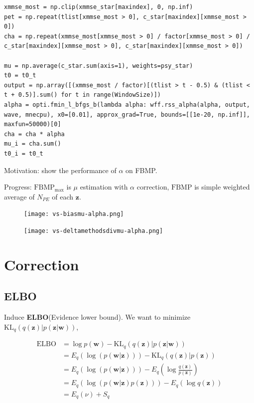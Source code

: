 \documentclass[notitlepage]{article}
\begin{document}
\begin{lstlisting}
xmmse_most = np.clip(xmmse_star[maxindex], 0, np.inf)
pet = np.repeat(tlist[xmmse_most > 0], c_star[maxindex][xmmse_most > 0])
cha = np.repeat(xmmse_most[xmmse_most > 0] / factor[xmmse_most > 0] / c_star[maxindex][xmmse_most > 0], c_star[maxindex][xmmse_most > 0])

mu = np.average(c_star.sum(axis=1), weights=psy_star)
t0 = t0_t
output = np.array([(xmmse_most / factor)[(tlist > t - 0.5) & (tlist < t + 0.5)].sum() for t in range(WindowSize)])
alpha = opti.fmin_l_bfgs_b(lambda alpha: wff.rss_alpha(alpha, output, wave, mnecpu), x0=[0.01], approx_grad=True, bounds=[[1e-20, np.inf]], maxfun=50000)[0]
cha = cha * alpha
mu_i = cha.sum()
t0_i = t0_t
\end{lstlisting}

Motivation: show the performance of $\alpha$ on FBMP. 

Progress: $\mathrm{FBMP_{max}}$ is $\mu$ estimation with $\alpha$ correction, $\mathrm{FBMP}$ is simple weighted average of $N_{PE}$ of each $\bm{z}$. 

\begin{figure}[H]
    \texttt{[image: vs-biasmu-alpha.png]}
\end{figure}

\begin{figure}[H]
    \texttt{[image: vs-deltamethodsdivmu-alpha.png]}
\end{figure}

\section{Correction}

\subsection{ELBO}

Induce \textbf{ELBO}(Evidence lower bound). We want to minimize $\mathrm{KL}_q(q(\bm{z})|p(\bm{z}|\bm{w}))$, 

\begin{align}
    \mathrm{ELBO} &= \log p(\bm{w}) - \mathrm{KL}_q(q(\bm{z})|p(\bm{z}|\bm{w})) \\
    &= E_q(\log(p(\bm{w}|\bm{z}))) - \mathrm{KL}_q(q(\bm{z})|p(\bm{z})) \\
    &= E_q(\log(p(\bm{w}|\bm{z}))) - E_q(\log\frac{q(\bm{z})}{p(\bm{z})}) \\
    &= E_q(\log(p(\bm{w}|\bm{z})p(\bm{z}))) - E_q(\log q(\bm{z})) \\
    &= E_q(\nu) + S_q
\end{align}
\end{document}
